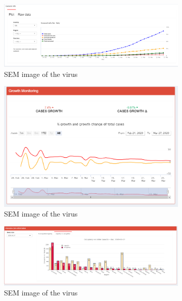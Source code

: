 \documentclass[
12pt, %
a4paper, %
oneside, %
headinclude,footinclude, %
BCOR5mm, %
]{scrartcl}
\begin{document}
\begin{figure}[H]
\begin{subfigure}{0.5\textwidth}
  \centering
  \includegraphics[width=1\linewidth]{Figures/Inspection_general_info.png} 
  \caption{SEM image of the virus}
  \label{fig:Inspection_general_info}
\end{subfigure} 
\begin{subfigure}{0.5\textwidth}
  \centering
  \includegraphics[width=1\linewidth]{Figures/Inspection_growth_monitoring.png} 
  \caption{SEM image of the virus}
  \label{fig:Inspection_growth_monitoring}
\end{subfigure} 
\begin{subfigure}{0.5\textwidth}
  \centering
  \includegraphics[width=1\linewidth]{Figures/Inspection_occupancy2.png} 
  \caption{SEM image of the virus}
  \label{fig:Inspection_occupancy2}
\end{subfigure}\hspace{0.3\textwidth}
\caption{ }
\label{fig:Inspection_panels_2}
\end{figure}
\end{document}
